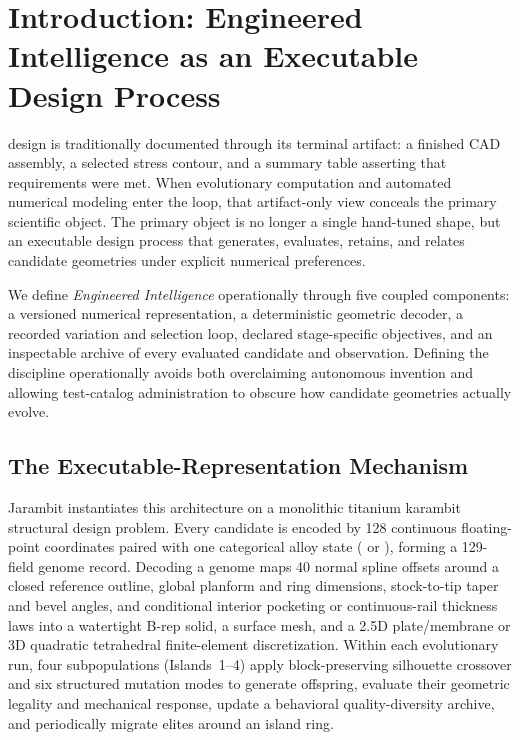 \section{Introduction: Engineered Intelligence as an Executable Design Process}
\label{sec:introduction}
 design is traditionally documented through its terminal artifact: a finished CAD assembly, a selected stress contour, and a summary table asserting that requirements were met. When evolutionary computation and automated numerical modeling enter the loop, that artifact-only view conceals the primary scientific object. The primary object is no longer a single hand-tuned shape, but an executable design process that generates, evaluates, retains, and relates candidate geometries under explicit numerical preferences.

We define \emph{Engineered Intelligence} operationally through five coupled components: a versioned numerical representation, a deterministic geometric decoder, a recorded variation and selection loop, declared stage-specific objectives, and an inspectable archive of every evaluated candidate and observation. Defining the discipline operationally avoids both overclaiming autonomous invention and allowing test-catalog administration to obscure how candidate geometries actually evolve.

\subsection{The Executable-Representation Mechanism}
\label{subsec:executable-mechanism}
Jarambit instantiates this architecture on a monolithic titanium karambit structural design problem. Every candidate is encoded by 128 continuous floating-point coordinates paired with one categorical alloy state ( or ), forming a 129-field genome record. Decoding a genome maps 40 normal spline offsets around a closed reference outline, global planform and ring dimensions, stock-to-tip taper and bevel angles, and conditional interior pocketing or continuous-rail thickness laws into a watertight B-rep solid, a surface mesh, and a 2.5D plate/membrane or 3D quadratic tetrahedral finite-element discretization. Within each evolutionary run, four subpopulations (Islands~1--4) apply block-preserving silhouette crossover and six structured mutation modes to generate offspring, evaluate their geometric legality and mechanical response, update a behavioral quality-diversity archive, and periodically migrate elites around an island ring.


